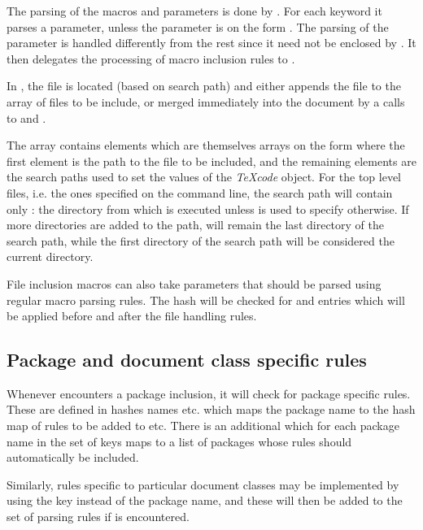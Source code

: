 \documentclass{article}
\newcommand\Obj[1]{\textsl{#1}}
\begin{document}
The parsing of the macros and parameters is done by . For each keyword it parses a parameter, unless the parameter is on the form . The parsing of the  parameter is handled differently from the rest since it need not be enclosed by \code{\{\}}. It then delegates the processing of macro inclusion rules to .

In , the file is located (based on search path) and either appends the file to the  array of files to be include, or merged immediately into the document by a calls to  and .

The  array contains elements which are themselves arrays on the form  where the first element is the path to the file to be included, and the remaining elements are the search paths used to set the  values of the \Obj{TeXcode} object. For the top level files, i.e. the ones specified on the command line, the search path will contain only : the directory from which \TeXcount{} is executed unless  is used to specify otherwise. If more directories are added to the path,  will remain the last directory of the search path, while the first directory of the search path will be considered the current directory.

File inclusion macros can also take parameters that should be parsed using regular macro parsing rules. The  hash will be checked for  and  entries which will be applied before and after the file handling rules.


\subsection{Package and document class specific rules}

Whenever \TeXcount{} encounters a package inclusion, it will check for package specific rules. These are defined in hashes names  etc. which maps the package name to the hash map of rules to be added to  etc. There is an additional  which for each package name in the set of keys maps to a list of packages whose rules should automatically be included.

Similarly, rules specific to particular document classes may be implemented by using the key  instead of the package name, and these will then be added to the set of parsing rules if  is encountered.
\end{document}
